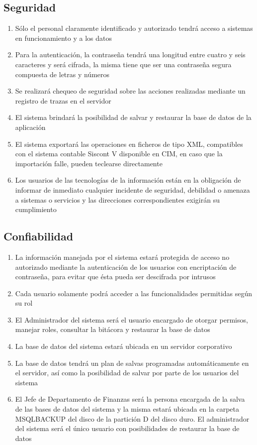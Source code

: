 \subsection{Seguridad}
\begin{enumerate}
	\item Sólo el personal claramente identificado y autorizado tendrá acceso a sistemas en funcionamiento y a los datos \cite{jacobson_casos_2013}
	\item Para la autenticación, la contraseña tendrá una longitud entre cuatro y seis caracteres y será cifrada, la misma tiene que ser una contraseña segura compuesta de letras y números
	\item Se realizará chequeo de seguridad sobre las acciones realizadas mediante un registro de trazas en el servidor
	\item El sistema brindará la posibilidad de salvar y restaurar la base de datos de la aplicación
	\item El sistema exportará las operaciones en ficheros de tipo XML, compatibles con el sistema contable Siscont V disponible en CIM, en caso que la importación falle, pueden teclearse directamente
	\item Los usuarios de las tecnologías de la información están en la obligación de informar de inmediato cualquier incidente de seguridad, debilidad o amenaza a sistemas o servicios y las direcciones correspondientes exigirán su cumplimiento \cite{jacobson_casos_2013}
\end{enumerate}

\subsection{Confiabilidad}
\begin{enumerate}
	\item La información manejada por el sistema estará protegida de acceso no autorizado mediante la autenticación de los usuarios con encriptación de contraseña, para evitar que ésta pueda ser descifrada por intrusos 
	\item Cada usuario solamente podrá acceder a las funcionalidades permitidas según su rol
	\item El Administrador del sistema será el usuario encargado de otorgar permisos, manejar roles, consultar la bitácora y restaurar la base de datos
	\item La base de datos del sistema estará ubicada en un servidor corporativo
	\item La base de datos tendrá un plan de salvas programadas automáticamente en el servidor, así como la posibilidad de salvar por parte de los usuarios del sistema
	\item El Jefe de Departamento de Finanzas será la persona encargada de la salva	de las bases de datos del sistema y la misma estará ubicada en la carpeta	MSQLBACKUP del disco de la partición D del disco duro. El administrador	del sistema será el único usuario con posibilidades de restaurar la base de	datos
\end{enumerate}
